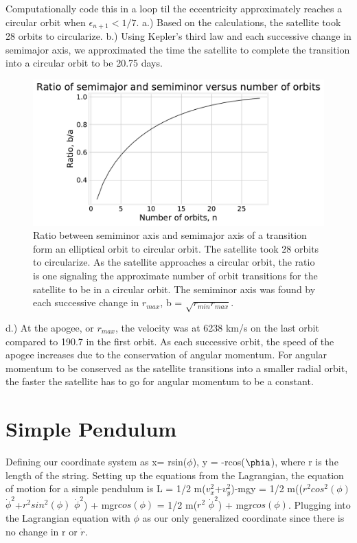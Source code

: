 \documentclass[11pt]{article}
\begin{document}
Computationally code this in a loop til the eccentricity approximately reaches a circular orbit when $\epsilon_{n+1} < 1/7$. 
a.) Based on the calculations, the satellite took 28 orbits to circularize.
b.) Using Kepler's third law and each successive change in semimajor axis, we approximated the time the satellite to complete the transition into a circular orbit to be 20.75 days.  

\begin{figure}[H]
    \centering
    \includegraphics[width = 12 cm]{src/Ratio.pdf}
    \caption{Ratio between semiminor axis and semimajor axis of a transition form an elliptical orbit to circular orbit. The satellite took 28 orbits to circularize. As the satellite approaches a circular orbit, the ratio is one signaling the approximate number of orbit transitions for the satellite to be in a circular orbit. The semiminor axis was found by each successive change in $r_{max}$, b = $\sqrt{r_{min}r_{max}}$.}
    \label{fig:my_label}
\end{figure}
d.) At the apogee, or $r_{max}$, the velocity was at 6238 km/s on the last orbit compared to 190.7 in the first orbit. As each successive orbit, the speed of the apogee increases due to the conservation of angular momentum. For angular momentum to be conserved as the satellite transitions into a smaller radial orbit, the faster the satellite has to go for angular momentum to be a constant.

\clearpage
\section*{Simple Pendulum}
    Defining our coordinate system as x= rsin($\phi$), y = -rcos($\phia$), where r is the length of the string. Setting up the equations 
    from the Lagrangian, the equation of motion for a simple pendulum is L = 1/2 m($v_x^2$+$v_y^2$)-mgy = 1/2 m(($r^2cos^2(\phi)$ 
    $\dot{\phi}^2$+$r^2sin^2(\phi)$ $\dot{\phi}^2$) + mgr$cos(\phi)$ = 1/2 m($r^2$ $\Dot{\phi}^2$) + mgr$cos(\phi)$. Plugging into the 
    Lagrangian equation with $\phi$ as our only generalized coordinate since there is no change in r or $\dot{r}$. 
    
\end{document}
